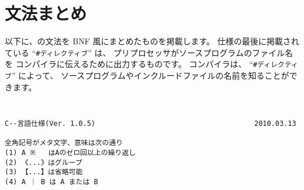 % 
%
\chapter{\cmml 文法まとめ}

以下に、\cmml の文法を BNF 風にまとめたものを掲載します。
仕様の最後に掲載されている ``\verb/#ディレクティブ/'' は、
プリプロセッサがソースプログラムのファイル名を
\cmm コンパイラに伝えるために出力するものです。
\cmm コンパイラは、
``\verb/#ディレクティブ/'' によって、
ソースプログラムやインクルードファイルの名前を知ることができます。

\begin{mylist}
{\small\tt
\begin{verbatim}
C--言語仕様(Ver. 1.0.5)                                      2010.03.13

全角記号がメタ文字、意味は次の通り
(1) A ※   はAのゼロ回以上の繰り返し
(2) 《...》はグループ
(3) 【...】は省略可能
(4) A ｜ B は A または B

\end{verbatim}

}
\end{mylist}

